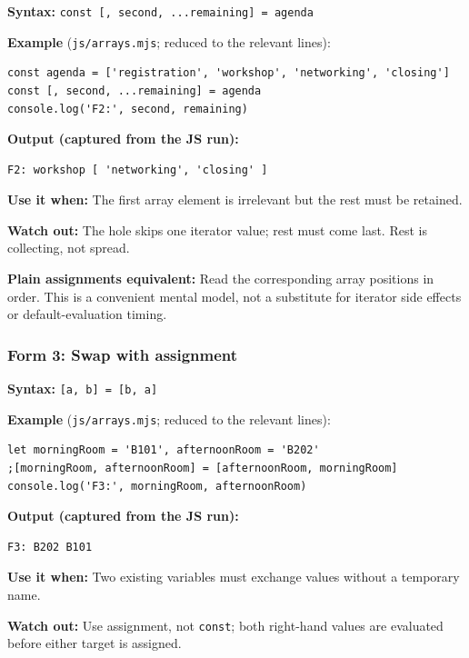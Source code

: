 \documentclass[
  10pt,
]{article}
\newcommand{\passthrough}[1]{#1}
\begin{document}
\textbf{Syntax:}
\passthrough{\lstinline!const [, second, ...remaining] = agenda!}

\textbf{Example} (\passthrough{\lstinline!js/arrays.mjs!}; reduced to
the relevant lines):

\begin{lstlisting}
const agenda = ['registration', 'workshop', 'networking', 'closing']
const [, second, ...remaining] = agenda
console.log('F2:', second, remaining)
\end{lstlisting}

\textbf{Output (captured from the JS run):}

\begin{lstlisting}
F2: workshop [ 'networking', 'closing' ]
\end{lstlisting}

\textbf{Use it when:} The first array element is irrelevant but the rest
must be retained.

\textbf{Watch out:} The hole skips one iterator value; rest must come
last. Rest is collecting, not spread.

\textbf{Plain assignments equivalent:} Read the corresponding array
positions in order. This is a convenient mental model, not a substitute
for iterator side effects or default-evaluation timing.

\subsubsection{Form 3: Swap with
assignment}\label{form-3-swap-with-assignment}

\textbf{Syntax:} \passthrough{\lstinline![a, b] = [b, a]!}

\textbf{Example} (\passthrough{\lstinline!js/arrays.mjs!}; reduced to
the relevant lines):

\begin{lstlisting}
let morningRoom = 'B101', afternoonRoom = 'B202'
;[morningRoom, afternoonRoom] = [afternoonRoom, morningRoom]
console.log('F3:', morningRoom, afternoonRoom)
\end{lstlisting}

\textbf{Output (captured from the JS run):}

\begin{lstlisting}
F3: B202 B101
\end{lstlisting}

\textbf{Use it when:} Two existing variables must exchange values
without a temporary name.

\textbf{Watch out:} Use assignment, not \passthrough{\lstinline!const!};
both right-hand values are evaluated before either target is assigned.
\end{document}
